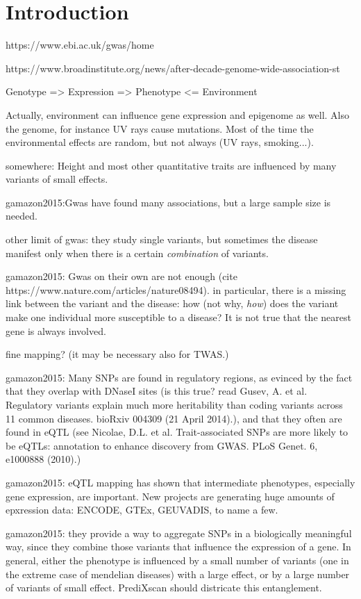 \documentclass[../main.tex]{subfiles}
\begin{document}
\chapter{Introduction}

https://www.ebi.ac.uk/gwas/home

https://www.broadinstitute.org/news/after-decade-genome-wide-association-st

Genotype => Expression => Phenotype <= Environment

Actually, environment can influence gene expression and epigenome as 
well. Also the genome, for instance UV rays cause mutations. Most of the 
time the environmental effects are random, but not always (\eg UV rays, 
smoking...).

somewhere: Height and most other quantitative traits are influenced by 
many variants of small effects.

gamazon2015:Gwas have found many associations, but a large sample size 
is needed.

other limit of gwas: they study single variants, but sometimes the 
disease manifest only when there is a certain \textit{combination} of 
variants.

gamazon2015: Gwas on their own are not enough (cite 
https://www.nature.com/articles/nature08494). in particular, there is a 
missing link between the variant and the disease: how (not why, 
\textit{how}) does the variant make one individual more susceptible to a 
disease? It is not true that the nearest gene is always involved.

fine mapping? (it may be necessary also for TWAS.)

gamazon2015: Many SNPs are found in regulatory regions, as evinced by 
the fact that they overlap with DNaseI sites (is this true? read Gusev, 
A. et al. Regulatory variants explain much more heritability than coding 
variants across 11 common diseases. bioRxiv 004309 (21 April 2014).), 
and that they often are found in eQTL (see Nicolae, D.L. et al. 
Trait-associated SNPs are more likely to be eQTLs: annotation to enhance 
discovery from GWAS. PLoS Genet. 6, e1000888 (2010).)

gamazon2015: eQTL mapping has shown that intermediate phenotypes, 
especially gene expression, are important. New projects are generating 
huge amounts of epxression data: ENCODE, GTEx, GEUVADIS, to name a few.

gamazon2015: they provide a way to aggregate SNPs in a biologically 
meaningful way, since they combine those variants that influence the 
expression of a gene. In general, either the phenotype is influenced by 
a small number of variants (one in the extreme case of mendelian 
diseases) with a large effect, or by a large number of variants of small 
effect. PrediXscan should districate this entanglement.
\end{document}
